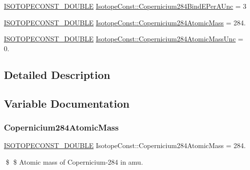 \begin{DoxyCompactItemize}
\item 
\mbox{\hyperlink{group___isotope_const-_macros_ga8f45a7272ce02c0b4c65c44636ed719a}{I\+S\+O\+T\+O\+P\+E\+C\+O\+N\+S\+T\+\_\+\+D\+O\+U\+B\+LE}} \mbox{\hyperlink{group___isotope_const-_copernicium-_cn284_gafdde45a5be1605f9f80920113d0ec94c}{Isotope\+Const\+::\+Copernicium284\+Bind\+E\+Per\+A\+Unc}} = 3
\item 
\mbox{\hyperlink{group___isotope_const-_macros_ga8f45a7272ce02c0b4c65c44636ed719a}{I\+S\+O\+T\+O\+P\+E\+C\+O\+N\+S\+T\+\_\+\+D\+O\+U\+B\+LE}} \mbox{\hyperlink{group___isotope_const-_copernicium-_cn284_ga9a46795925f7ab377257381493f8ab57}{Isotope\+Const\+::\+Copernicium284\+Atomic\+Mass}} = 284.
\item 
\mbox{\hyperlink{group___isotope_const-_macros_ga8f45a7272ce02c0b4c65c44636ed719a}{I\+S\+O\+T\+O\+P\+E\+C\+O\+N\+S\+T\+\_\+\+D\+O\+U\+B\+LE}} \mbox{\hyperlink{group___isotope_const-_copernicium-_cn284_gafbf3a7f5e84e1bf1eac62af32fe77045}{Isotope\+Const\+::\+Copernicium284\+Atomic\+Mass\+Unc}} = 0.
\end{DoxyCompactItemize}


\subsection{Detailed Description}


\subsection{Variable Documentation}
\mbox{\label{group___isotope_const-_copernicium-_cn284_ga9a46795925f7ab377257381493f8ab57}} 
\subsubsection{\texorpdfstring{Copernicium284\+Atomic\+Mass}{Copernicium284AtomicMass}}
{\footnotesize\ttfamily \mbox{\hyperlink{group___isotope_const-_macros_ga8f45a7272ce02c0b4c65c44636ed719a}{I\+S\+O\+T\+O\+P\+E\+C\+O\+N\+S\+T\+\_\+\+D\+O\+U\+B\+LE}} Isotope\+Const\+::\+Copernicium284\+Atomic\+Mass = 284.}

\$ \$ Atomic mass of Copernicium-\/284 in amu. \mbox{\label{group___isotope_const-_copernicium-_cn284_gafbf3a7f5e84e1bf1eac62af32fe77045}} 

